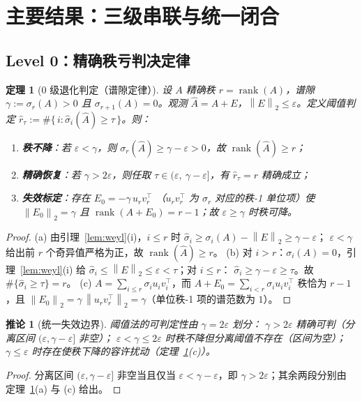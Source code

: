 \documentclass[UTF8,11pt,a4paper]{ctexart}
\theoremstyle{plain}
\newtheorem{theorem}{定理}
\newtheorem{corollary}{推论}
\theoremstyle{definition}
\theoremstyle{remark}
\newcommand{\rank}{\operatorname{rank}}
\newcommand{\Tnorm}[1]{\left\lVert #1\right\rVert_2}
\begin{document}
\section{主要结果：三级串联与统一闭合}\label{sec:main}

\subsection{Level 0：精确秩亏判决定律}\label{sec:main:l0}

\begin{theorem}[0 级退化判定（谱隙定律）]\label{thm:gap}
设 $A$ 精确秩 $r=\rank(A)$，谱隙 $\gamma:=\sigma_r(A)>0$ 且
$\sigma_{r+1}(A)=0$。观测 $\hat A=A+E$，$\Tnorm{E}\le\varepsilon$。定义阈值判定
$\hat r_\tau:=\#\{\,i:\hat\sigma_i(\hat A)\ge\tau\,\}$。则：
\begin{enumerate}
\item[(a)] \textbf{秩不降}：若 $\varepsilon<\gamma$，则
  $\sigma_r(\hat A)\ge\gamma-\varepsilon>0$，故 $\rank(\hat A)\ge r$；
\item[(b)] \textbf{精确恢复}：若 $\gamma>2\varepsilon$，则任取
  $\tau\in(\varepsilon,\ \gamma-\varepsilon]$，有 $\hat r_\tau=r$ 精确成立；
\item[(c)] \textbf{失效标定}：存在 $E_0=-\gamma\,u_rv_r^\top$
  （$u_rv_r^\top$ 为 $\sigma_r$ 对应的秩-1 单位项）使
  $\Tnorm{E_0}=\gamma$ 且 $\rank(A+E_0)=r-1$；故 $\varepsilon\ge\gamma$ 时秩可降。
\end{enumerate}
\end{theorem}
\begin{proof}
(a) 由引理~\ref{lem:weyl}(i)，$i\le r$ 时
$\hat\sigma_i\ge\sigma_i(A)-\Tnorm{E}\ge\gamma-\varepsilon$；
$\varepsilon<\gamma$ 给出前 $r$ 个奇异值严格为正，故 $\rank(\hat A)\ge r$。
(b) 对 $i>r$：$\sigma_i(A)=0$，引理~\ref{lem:weyl}(i) 给
$\hat\sigma_i\le\Tnorm{E}\le\varepsilon<\tau$；对 $i\le r$：
$\hat\sigma_i\ge\gamma-\varepsilon\ge\tau$。故
$\#\{\hat\sigma_i\ge\tau\}=r$。
(c) $A=\sum_{i\le r}\sigma_iu_iv_i^\top$，而
$A+E_0=\sum_{i<r}\sigma_iu_iv_i^\top$ 秩恰为 $r-1$，且
$\Tnorm{E_0}=\gamma\,\Tnorm{u_rv_r^\top}=\gamma$（单位秩-1 项的谱范数为 $1$）。
\end{proof}

\begin{corollary}[统一失效边界]\label{cor:fail}
阈值法的可判定性由 $\gamma=2\varepsilon$ 划分：
$\gamma>2\varepsilon$ 精确可判（分离区间 $(\varepsilon,\gamma-\varepsilon]$ 非空）；
$\varepsilon<\gamma\le2\varepsilon$ 时秩不降但分离阈值不存在（区间为空）；
$\gamma\le\varepsilon$ 时存在使秩下降的容许扰动（定理~\ref{thm:gap}(c)）。
\end{corollary}
\begin{proof}
分离区间 $(\varepsilon,\gamma-\varepsilon]$ 非空当且仅当
$\varepsilon<\gamma-\varepsilon$，即 $\gamma>2\varepsilon$；其余两段分别由
定理~\ref{thm:gap}(a) 与 (c) 给出。
\end{proof}
\end{document}
